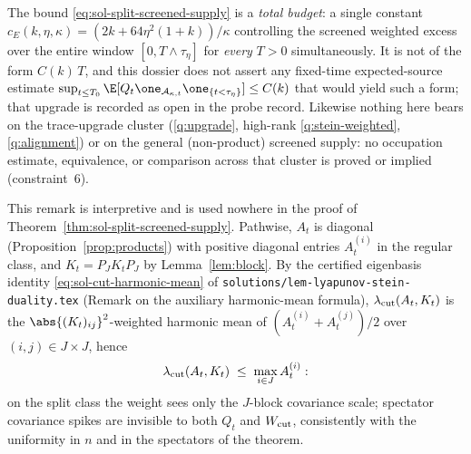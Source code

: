 \documentclass[../main.tex]{subfiles}
\begin{document}
\begin{remark}
\label{rem:sol-shape}
The bound \eqref{eq:sol-split-screened-supply} is a \emph{total budget}: a single constant
$c_E(k,\eta,\kappa)=(2k+64\eta^2(1+k))/\kappa$ controlling the screened weighted excess over
the entire window $[0,T\wedge\tau_\eta]$ for \emph{every} $T>0$ simultaneously.  It is not of
the form $C(k)\,T$, and this dossier does not assert any fixed-time expected-source estimate
$\sup_{t\le T_0}\E[Q_t\one_{\mathcal A_{\kappa,t}}\one_{\{t<\tau_\eta\}}]\le C(k)$ that would
yield such a form; that upgrade is recorded as open in the probe record.  Likewise nothing
here bears on the trace-upgrade cluster
(\ref{q:upgrade}, high-rank \ref{q:stein-weighted}, \ref{q:alignment}) or on the general
(non-product) screened supply: no occupation estimate, equivalence, or comparison across
that cluster is proved or implied (constraint~6).
\end{remark}

\begin{remark}
\label{rem:sol-harmonic-mean}
This remark is interpretive and is used nowhere in the proof of
Theorem~\ref{thm:sol-split-screened-supply}.  Pathwise, $A_t$ is diagonal
(Proposition~\ref{prop:products}) with positive diagonal entries $A_t^{(i)}$ in the regular
class, and $K_t=P_JK_tP_J$ by Lemma~\ref{lem:block}.  By the certified eigenbasis identity
\eqref{eq:sol-cut-harmonic-mean} of
\texttt{solutions/lem-lyapunov-stein-duality.tex} (Remark on the auxiliary harmonic-mean
formula), $\lambda_{\rm cut}(A_t,K_t)$ is the $\abs{(K_t)_{ij}}^2$-weighted harmonic mean of
$(A_t^{(i)}+A_t^{(j)})/2$ over $(i,j)\in J\times J$, hence
\[
  \lambda_{\rm cut}(A_t,K_t)\;\le\;\max_{i\in J}A_t^{(i)} :
\]
on the split class the weight sees only the $J$-block covariance scale; spectator covariance
spikes are invisible to both $Q_t$ and $W_{\rm cut}$, consistently with the uniformity in
$n$ and in the spectators of the theorem.
\end{remark}
\end{document}
